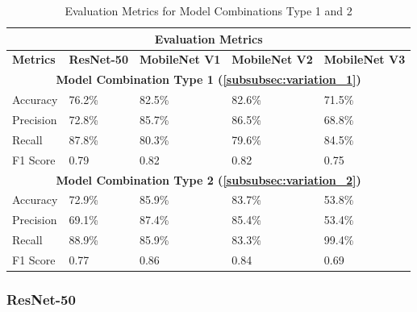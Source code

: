 \begin{table}[H]
\centering
\begin{tabularx}{\textwidth}{@{} *5{X} @{}}
\toprule
\multicolumn{5}{c}{\textbf{Evaluation Metrics}}                                    \\ \midrule
\addlinespace
\raggedright \textbf{Metrics}           & \textbf{ResNet-50} & \textbf{MobileNet V1} & \textbf{MobileNet V2} & \textbf{MobileNet V3} \\ \midrule
\multicolumn{5}{c}{\textbf{Model Combination Type 1 (\ref{subsubsec:variation_1})}}                                    \\ \midrule
Accuracy                        &  76.2\%         & 82.5\%            &   82.6\%       &   71.5\%           \\ \midrule
Precision                       &  72.8\%         & 85.7\%            &   86.5\%       &   68.8\%           \\ \midrule
Recall                          &  87.8\%         & 80.3\%            &   79.6\%       &   84.5\%          \\ \midrule
F1 Score               &  0.79         &  0.82            &  0.82            & 0.75           \\ \midrule
\multicolumn{5}{c}{\textbf{Model Combination Type 2 (\ref{subsubsec:variation_2})}}                                    \\ \midrule
Accuracy             &  72.9\%                  &   85.9\%           &  83.7\%      &   53.8\%           \\ \midrule
Precision            &  69.1\%                  &   87.4\%           &  85.4\%      &   53.4\%           \\ \midrule
Recall               &  88.9\%                  &   85.9\%           &  83.3\%      &   99.4\%          \\ \midrule
F1 Score               &  0.77         &  0.86            &  0.84            &   0.69         \\ 
\bottomrule
\end{tabularx}
\caption{Evaluation Metrics for Model Combinations Type 1 and 2 }
\label{table:results_4}
\end{table}

\subsubsection{ResNet-50}

